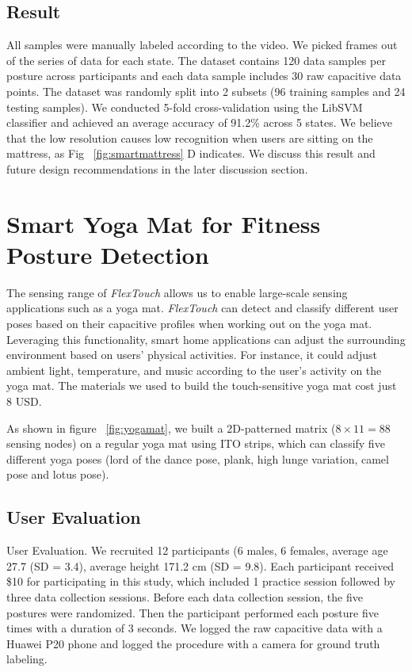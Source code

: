 \subsection{Result}
All samples were manually labeled according to the video. We picked frames out of the series of data for each state. The dataset contains 120 data samples per posture across participants and each data sample includes 30 raw capacitive data points. The dataset was randomly split into 2 subsets (96 training samples and 24 testing samples). We conducted 5-fold cross-validation using the LibSVM classifier and achieved an average accuracy of 91.2\% across 5 states. We believe that the low resolution causes low recognition when users are sitting on the mattress, as Fig ~\ref{fig:smartmattress} D indicates. We discuss this result and future design recommendations in the later discussion section.   

\section{Smart Yoga Mat for Fitness Posture Detection}
The sensing range of \textit{FlexTouch} allows us to enable large-scale sensing applications such as a yoga mat.  \textit{FlexTouch} can detect and classify different user poses based on their capacitive profiles when working out on the yoga mat. Leveraging this functionality, smart home applications can adjust the surrounding environment based on users' physical activities. For instance, it could adjust ambient light, temperature, and music according to the user's activity on the yoga mat. The materials we used to build the touch-sensitive yoga mat cost just 8 USD. 


As shown in figure ~\ref{fig:yogamat}, we built a 2D-patterned matrix ($8\times11 = 88$ sensing nodes) on a regular yoga mat using ITO strips, which can classify five different yoga poses (lord of the dance pose, plank, high lunge variation, camel pose and lotus pose).

\subsection{User Evaluation}
User Evaluation. We recruited 12 participants (6 males, 6 females, average age 27.7 (SD = 3.4), average height 171.2 cm (SD = 9.8). Each participant received \$10 for participating in this study, which included 1 practice session followed by three data collection sessions. Before each data collection session, the five postures were randomized. Then the participant performed each posture five times with a duration of 3 seconds. We logged the raw capacitive data with a Huawei P20 phone and logged the procedure with a camera for ground truth labeling.

